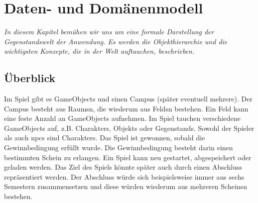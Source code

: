 \chapter{Daten- und Domänenmodell}
\textit{In diesem Kapitel bemühen wir uns um eine formale Darstellung der Gegenstandswelt der Anwendung. Es 
werden die Objekthierarchie und die wichtigsten Konzepte, die in der \gls{Welt} auftauchen, beschrieben.}

\section{Überblick}
Im \gls{Spiel} gibt es \glspl{GameObject} und einen \gls{Campus} (später eventuell mehrere). 
Der \gls{Campus} besteht aus \glspl{Raum}n, die wiederum aus \glspl{Feld}n bestehen. Ein \gls{Feld} kann eine 
feste Anzahl an \glspl{GameObject} aufnehmen. Im \gls{Spiel} tauchen verschiedene \glspl{GameObject} auf, z.B. 
\glspl{Charakter}, \glspl{Objekt} oder \glspl{Gegenstand}. Sowohl der \gls{Spieler} als auch \gls{npcs} sind
\glspl{Charakter}. 
Das Spiel ist gewonnen, sobald die Gewinnbedingung erfüllt wurde. Die Gewinnbedingung besteht darin einen 
bestimmten \gls{Schein} zu erlangen. Ein \gls{Spiel} kann neu gestartet, abgespeichert oder geladen werden.
Das Ziel des \gls{Spiel}s könnte später auch durch einen Abschluss 
repräsentiert werden. Der Abschluss würde sich beispielsweise immer aus sechs Semestern zusammensetzen
und diese würden wiederum aus mehreren \glspl{Schein}n bestehen.

